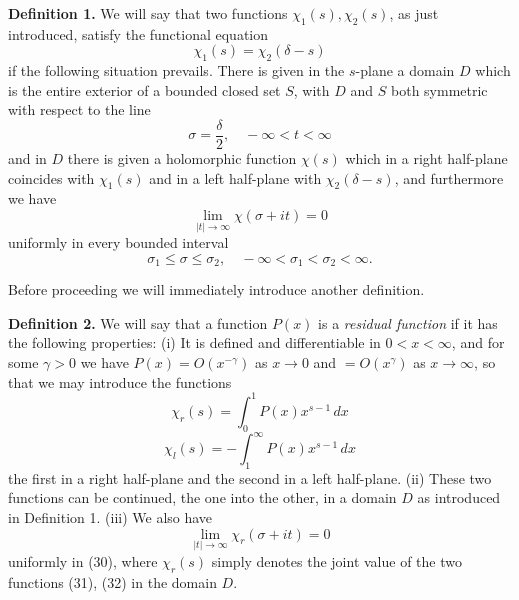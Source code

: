 \documentclass[12pt]{article}
\begin{document}
\medskip

\noindent\textbf{Definition 1.} We will say that two functions \(\chi_1(s), \chi_2(s)\), as just introduced, satisfy the functional equation
\begin{equation}
\chi_1(s) = \chi_2(\delta - s)
\tag{27}
\end{equation}
if the following situation prevails. There is given in the \(s\)-plane a domain \(D\) which is the entire exterior of a bounded closed set \(S\), with \(D\) and \(S\) both symmetric with respect to the line
\begin{equation}
\sigma = \frac{\delta}{2}, \quad -\infty < t < \infty
\tag{28}
\end{equation}
and in \(D\) there is given a holomorphic function \(\chi(s)\) which in a right half-plane coincides with \(\chi_1(s)\) and in a left half-plane with \(\chi_2(\delta - s)\), and furthermore we have
\begin{equation}
\lim_{|t| \to \infty} \chi(\sigma + it) = 0
\tag{29}
\end{equation}
uniformly in every bounded interval
\begin{equation}
\sigma_1 \le \sigma \le \sigma_2, \quad -\infty < \sigma_1 < \sigma_2 < \infty.
\tag{30}
\end{equation}

Before proceeding we will immediately introduce another definition.

\medskip

\noindent\textbf{Definition 2.} We will say that a function \(P(x)\) is a \emph{residual function} if it has the following properties: (i) It is defined and differentiable in \(0 < x < \infty\), and for some \(\gamma > 0\) we have \(P(x) = O(x^{-\gamma})\) as \(x \to 0\) and \(= O(x^\gamma)\) as \(x \to \infty\), so that we may introduce the functions
\begin{equation}
\chi_r(s) = \int_0^1 P(x) x^{s-1} \, dx
\tag{31}
\end{equation}
\begin{equation}
\chi_l(s) = -\int_1^{\infty} P(x) x^{s-1} \, dx
\tag{32}
\end{equation}
the first in a right half-plane and the second in a left half-plane. (ii) These two functions can be continued, the one into the other, in a domain \(D\) as introduced in Definition 1. (iii) We also have
\begin{equation}
\lim_{|t| \to \infty} \chi_r(\sigma + it) = 0
\tag{33}
\end{equation}
uniformly in (30), where \(\chi_r(s)\) simply denotes the joint value of the two functions (31), (32) in the domain \(D\).
\end{document}
